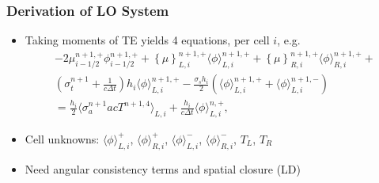 \documentclass[xcolor=dvipsnames,hyperref={pdfpagelabels=false},unknownkeysallowed,
handout]{beamer}
\newcommand{\colb}[1]{{\color{blue} #1}}
\newlength{\wideitemsep}
\let\olditem\item
\renewcommand{\item}{\setlength{\itemsep}{\wideitemsep}\olditem}
\newcommand{\mom}[1]{\langle #1 \rangle}
\newcommand{\cur}[1]{\left\{ #1 \right\}}
\begin{document}
\begin{frame}
    \frametitle{Derivation of LO System}
    \begin{itemize}
        \item Taking moments of TE yields \colb{4 equations}, per cell $i$, e.g.
\begin{multline}\label{lo_tran}
    -2{\mu}_{i-1/2}^{n+1,+} \phi_{i-1/2}^{n+1,+} + \cur {\mu}_{L,i}^{n+1,+}
  \mom{\phi}_{L,i}^{n+1,+}
  +  \cur\mu_{R,i}^{n+1,+}
  \mom{\phi}_{R,i}^{n+1,+} +  \\ \left(\sigma_t^{n+1}+\frac{1}{c \Delta t} \right) h_i 
  \mom{\phi}_{L,i}^{n+1,+} -  \frac{\sigma_s h_i}{2} \left( \mom{\phi}_{L,i}^{n+1,+} +
  \mom\phi_{L,i}^{n+1,-}\right) \\ = \frac{h_i}{2} \mom{\sigma_a^{n+1} a c T^{n+1,4}}_{L,i} +
  \frac{h_i}{c\Delta t}\mom{\phi}_{L,i}^{n,+},
\end{multline}
        \item Cell unknowns: $\mom{\phi}_{L,i}^{+}$, $\mom{\phi}_{R,i}^{+}$,
        $\mom{\phi}_{L,i}^{-}$, $\mom{\phi}_{R,i}^{-}$, $T_L$, $T_R$

    \item Need \colb{angular} consistency terms  and spatial closure
        (LD)
    \end{itemize}

\end{frame}


\setcounter{framenumber}{\value{finalframe}}
\end{document}
